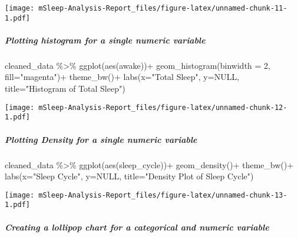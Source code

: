 \documentclass[
]{article}
\newenvironment{Shaded}{\begin{snugshade}}{\end{snugshade}}
\newcommand{\AttributeTok}[1]{\textcolor[rgb]{0.77,0.63,0.00}{#1}}
\newcommand{\ConstantTok}[1]{\textcolor[rgb]{0.00,0.00,0.00}{#1}}
\newcommand{\DecValTok}[1]{\textcolor[rgb]{0.00,0.00,0.81}{#1}}
\newcommand{\FunctionTok}[1]{\textcolor[rgb]{0.00,0.00,0.00}{#1}}
\newcommand{\NormalTok}[1]{#1}
\newcommand{\SpecialCharTok}[1]{\textcolor[rgb]{0.00,0.00,0.00}{#1}}
\newcommand{\StringTok}[1]{\textcolor[rgb]{0.31,0.60,0.02}{#1}}
\begin{document}
\texttt{[image: mSleep-Analysis-Report\_files/figure-latex/unnamed-chunk-11-1.pdf]}

\hypertarget{plotting-histogram-for-a-single-numeric-variable}{%
\subparagraph{Plotting histogram for a single numeric
variable}\label{plotting-histogram-for-a-single-numeric-variable}}

\begin{Shaded}
\begin{Highlighting}[]
\NormalTok{cleaned\_data }\SpecialCharTok{\%\textgreater{}\%} 
  \FunctionTok{ggplot}\NormalTok{(}\FunctionTok{aes}\NormalTok{(awake))}\SpecialCharTok{+}
  \FunctionTok{geom\_histogram}\NormalTok{(}\AttributeTok{binwidth =} \DecValTok{2}\NormalTok{, }\AttributeTok{fill=}\StringTok{"magenta"}\NormalTok{)}\SpecialCharTok{+}
  \FunctionTok{theme\_bw}\NormalTok{()}\SpecialCharTok{+}
  \FunctionTok{labs}\NormalTok{(}\AttributeTok{x=}\StringTok{"Total Sleep"}\NormalTok{,}
       \AttributeTok{y=}\ConstantTok{NULL}\NormalTok{,}
       \AttributeTok{title=}\StringTok{"Histogram of Total Sleep"}\NormalTok{)}
\end{Highlighting}
\end{Shaded}

\texttt{[image: mSleep-Analysis-Report\_files/figure-latex/unnamed-chunk-12-1.pdf]}

\hypertarget{plotting-density-for-a-single-numeric-variable}{%
\subparagraph{Plotting Density for a single numeric
variable}\label{plotting-density-for-a-single-numeric-variable}}

\begin{Shaded}
\begin{Highlighting}[]
\NormalTok{cleaned\_data }\SpecialCharTok{\%\textgreater{}\%} 
  \FunctionTok{ggplot}\NormalTok{(}\FunctionTok{aes}\NormalTok{(sleep\_cycle))}\SpecialCharTok{+}
  \FunctionTok{geom\_density}\NormalTok{()}\SpecialCharTok{+}
  \FunctionTok{theme\_bw}\NormalTok{()}\SpecialCharTok{+}
  \FunctionTok{labs}\NormalTok{(}\AttributeTok{x=}\StringTok{"Sleep Cycle"}\NormalTok{,}
       \AttributeTok{y=}\ConstantTok{NULL}\NormalTok{,}
       \AttributeTok{title=}\StringTok{"Density Plot of Sleep Cycle"}\NormalTok{)}
\end{Highlighting}
\end{Shaded}

\texttt{[image: mSleep-Analysis-Report\_files/figure-latex/unnamed-chunk-13-1.pdf]}

\hypertarget{creating-a-lollipop-chart-for-a-categorical-and-numeric-variable}{%
\subparagraph{Creating a lollipop chart for a categorical and numeric
variable}\label{creating-a-lollipop-chart-for-a-categorical-and-numeric-variable}}
\end{document}
